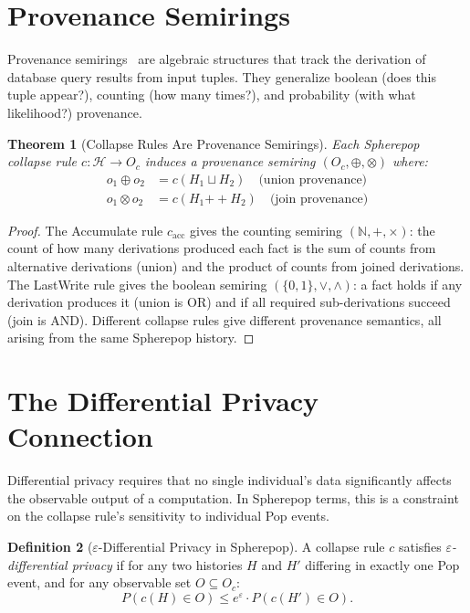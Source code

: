 \documentclass[12pt, a4paper, openany]{book}
\theoremstyle{plain}
\newtheorem{theorem}{Theorem}[chapter]
\theoremstyle{definition}
\newtheorem{definition}[theorem]{Definition}
\theoremstyle{remark}
\newcommand{\calH}{\mathcal{H}}
\begin{document}
\section{Provenance Semirings}

Provenance semirings~\cite{shapiro11} are algebraic structures that track the
derivation of database query results from input tuples. They generalize boolean
(does this tuple appear?), counting (how many times?), and probability
(with what likelihood?) provenance.

\begin{theorem}[Collapse Rules Are Provenance Semirings]
Each Spherepop collapse rule $c : \calH \to O_c$ induces a provenance semiring
$(O_c, \oplus, \otimes)$ where:
\begin{align*}
o_1 \oplus o_2 &= c(H_1 \sqcup H_2) \quad\text{(union provenance)} \\
o_1 \otimes o_2 &= c(H_1 \mathbin{++} H_2) \quad\text{(join provenance)}
\end{align*}
\end{theorem}

\begin{proof}
The Accumulate rule $c_{\mathrm{acc}}$ gives the counting semiring
$(\mathbb{N}, +, \times)$: the count of how many derivations produced each
fact is the sum of counts from alternative derivations (union) and the product
of counts from joined derivations. The LastWrite rule gives the boolean semiring
$(\{0,1\}, \vee, \wedge)$: a fact holds if any derivation produces it (union is
OR) and if all required sub-derivations succeed (join is AND). Different collapse
rules give different provenance semantics, all arising from the same Spherepop
history.
\end{proof}

\section{The Differential Privacy Connection}

Differential privacy requires that no single individual's data significantly
affects the observable output of a computation. In Spherepop terms, this is
a constraint on the collapse rule's sensitivity to individual Pop events.

\begin{definition}[$\varepsilon$-Differential Privacy in Spherepop]
A collapse rule $c$ satisfies \emph{$\varepsilon$-differential privacy} if
for any two histories $H$ and $H'$ differing in exactly one Pop event,
and for any observable set $O \subseteq O_c$:
\[
P(c(H) \in O) \leq e^\varepsilon \cdot P(c(H') \in O).
\]
\end{definition}
\end{document}
